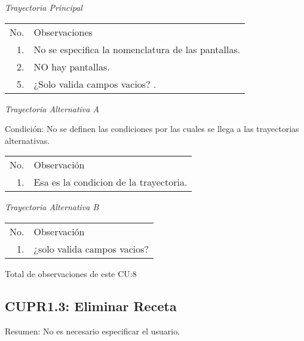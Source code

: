 \documentclass[10pt,spanish]{article}
\providecommand{\tabularnewline}{\\}
\begin{document}


\textit{\large Trayectoria Principal}{\large {} }{\large \par}
 
\begin{longtable}{rp{8cm}}
No.  & Observaciones\tabularnewline
1.  & No se especifica la nomenclatura de las pantallas.\tabularnewline
2.  & NO hay pantallas.\tabularnewline
5.  & ¿Solo valida campos vacios? .\tabularnewline

\end{longtable}

\textit{Trayectoria Alternativa A}

Condición: No se definen las condiciones por las cuales se llega a las trayectorias alternativas.

\begin{longtable}{rp{8cm}}
No.  & Observación\tabularnewline
1. & Esa es la condicion de la trayectoria.  \tabularnewline
\end{longtable}%
\textit{Trayectoria Alternativa B}

\begin{longtable}{rp{8cm}}
No.  & Observación\tabularnewline
1. & ¿solo valida campos vacios?   \tabularnewline
\end{longtable}%

Total de observaciones de este CU:8


\newpage{} 
 
\subsection{CUPR1.3: Eliminar Receta}

Resumen: No es necesario especificar el usuario.

\end{document}
